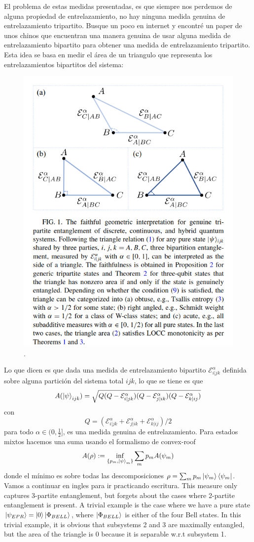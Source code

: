 El problema de estas medidas presentadas, es que siempre nos perdemos de alguna propiedad de entrelazamiento, no hay ninguna medida genuina de entrelazamiento tripartito. Busque un poco en internet y encontré un paper de unos chinos \cite{}  que encuentran una manera genuina de usar alguna medida de entrelazamiento bipartito para obtener una medida de entrelazamiento tripartito. Esta idea se basa en medir el área de un triangulo que representa los entrelazamientos bipartitos del sistema:
\begin{figure}
    \centering
    \includegraphics[width=0.5\linewidth]{figuras/ch2/triangulos.png}
    \caption{.}
    \label{fig2:triangulos}
\end{figure}
Lo que dicen es que dada una medida de entrelazamiento bipartito $\mathcal{E}^\alpha_{i|jk}$ definida sobre alguna partición del sistema total $ijk$, lo que se tiene es que
\begin{equation}
    A(\ket\psi_{ijk})=\sqrt{Q(Q-\mathcal{E}^\alpha_{i|jk})(Q-\mathcal{E}^\alpha_{j|ik})(Q-\mathcal{E}^\alpha_{k|ij})}
\end{equation}
con 
\begin{equation}
    Q=(\mathcal{E}^\alpha_{i|jk}+\mathcal{E}^\alpha_{j|ik}+\mathcal{E}^\alpha_{k|ij})/2
\end{equation}
para todo $\alpha\in(0,\frac{1}{2}]$, es una medida genuina de entrelazamiento. Para estados mixtos hacemos una suma usando el formalismo de convex-roof 
\begin{equation}
    A(\rho):= \inf_{\{p_m,\ket\psi_m\}}\sum_m p_m A(\psi_m)
\end{equation}
donde el mínimo es sobre todas las descomposiciones $\rho=\sum_mp_m\ket{\psi_m}\bra{\psi_m}$. Vamos a continuar en ingles para ir practicando escritura. This measure only captures 3-partite entanglement, but forgets about the cases where 2-partite entanglement is present. A trivial example is the case where we have a pure state $\ket{\psi_{EPR}}=\ket{0}\ket{\Phi_{BELL}}$, where $\ket{\Phi_{BELL}}$ is either of the four Bell states. In this trivial example, it is obvious that subsystems 2 and 3 are maximally entangled, but the area of the triangle is 0 because it is separable w.r.t subsystem 1. 

